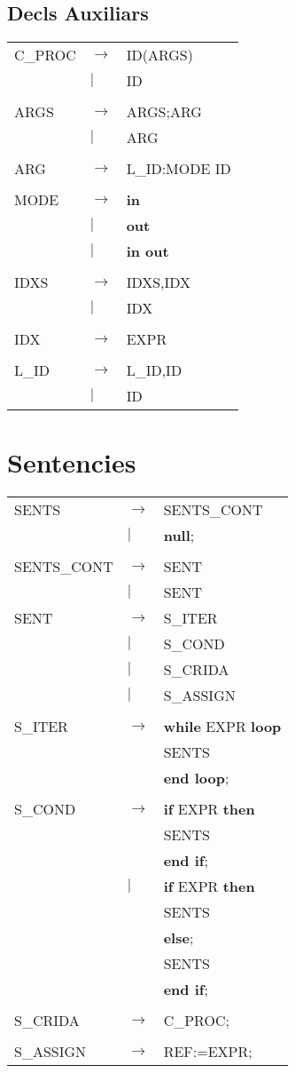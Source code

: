 \documentclass{article}
\begin{document}
	\subsection{Decls Auxiliars}
	\begin{tabular}{l l l}
		C\_PROC&$\to$&ID(ARGS)\\
		&$|$&ID\\
		\\
		ARGS&$\to$&ARGS;ARG\\
		&$|$&ARG\\
		\\
		ARG&$\to$&L\_ID:MODE ID\\
		\\
		MODE&$\to$&\textbf{in}\\
		&$|$&\textbf{out}\\
		&$|$&\textbf{in out}\\
		\\
		IDXS&$\to$&IDXS,IDX\\
		&$|$&IDX\\
		\\
		IDX&$\to$&EXPR\\
		\\
		L\_ID&$\to$&L\_ID,ID\\
		&$|$&ID
	\end{tabular}
	\section{Sentencies}
	\begin{tabular}{l l l}
		SENTS&$\to$&SENTS\_CONT\\
		&$|$&\textbf{null};\\
		\\
		SENTS\_CONT&$\to$&SENT\\
		&$|$&SENT
		\\
		SENT&$\to$&S\_ITER\\
		&$|$&S\_COND\\
		&$|$&S\_CRIDA\\
		&$|$&S\_ASSIGN\\
		\\
		S\_ITER&$\to$&\textbf{while} EXPR \textbf{loop}\\
		&&\hspace*{5mm}SENTS\\
		&&\textbf{end loop};\\
		\\
		S\_COND&$\to$&\textbf{if} EXPR \textbf{then}\\
		&&\hspace*{5mm}SENTS\\
		&&\textbf{end if};\\
		&$|$&\textbf{if} EXPR \textbf{then}\\
		&&\hspace*{5mm}SENTS\\
		&&\textbf{else};\\
		&&\hspace*{5mm}SENTS\\
		&&\textbf{end if};\\
		\\
		S\_CRIDA&$\to$&C\_PROC;\\
		\\
		S\_ASSIGN&$\to$&REF:=EXPR;
	\end{tabular}
\end{document}
